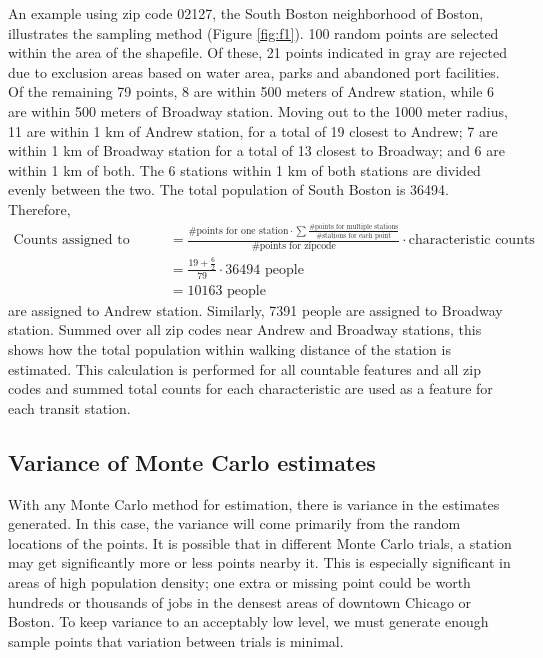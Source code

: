 \documentclass[11pt]{article}
\begin{document}
An example using zip code 02127, the South Boston neighborhood of Boston, illustrates the sampling method (Figure \ref{fig:f1}). 100 random points are selected within the area of the shapefile. Of these, 21 points indicated in gray are rejected due to exclusion areas based on water area, parks and abandoned port facilities. Of the remaining 79 points, 8 are within 500 meters of Andrew station, while 6 are within 500 meters of Broadway station. Moving out to the 1000 meter radius, 11 are within 1 km of Andrew station, for a total of 19 closest to Andrew; 7 are within 1 km of Broadway station for a total of 13 closest to Broadway; and 6 are within 1 km of both. The 6 stations within 1 km of both stations are divided evenly between the two. The total population of South Boston is 36494. Therefore, 
\begin{align*}
\text{Counts assigned to station} &= \frac{\text{\# points for one station} \cdot \sum\frac{\text{\# points for multiple stations}}{\text{\# stations for each point}}}{\text{\# points for zipcode}}\cdot\text{characteristic counts}  \\
&= \frac{19 + \frac{6}{2}}{79}\cdot 36494 \text{ people} \\
&= 10163 \text{ people}
\end{align*}
are assigned to Andrew station. Similarly, 7391 people are assigned to Broadway station. Summed over all zip codes near Andrew and Broadway stations, this shows how the total population within walking distance of the station is estimated. This calculation is performed for all countable features and all zip codes and summed total counts for each characteristic are used as a feature for each transit station. 

\subsection{Variance of Monte Carlo estimates}

With any Monte Carlo method for estimation, there is variance in the estimates generated. In this case, the variance will come primarily from the random locations of the points. It is possible that in different Monte Carlo trials, a station may get significantly more or less points nearby it. This is especially significant in areas of high population density; one extra or missing point could be worth hundreds or thousands of jobs in the densest areas of downtown Chicago or Boston. To keep variance to an acceptably low level, we must generate enough sample points that variation between trials is minimal. 
\end{document}
